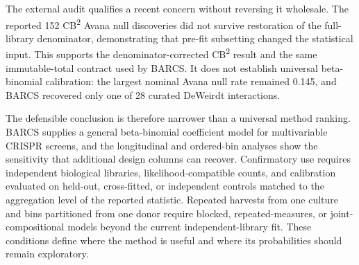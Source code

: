 The external audit qualifies a recent concern without reversing it wholesale.
The reported 152 CB\textsuperscript{2} Avana null discoveries did not survive
restoration of the full-library denominator, demonstrating that pre-fit
subsetting changed the statistical input.  This supports the
denominator-corrected CB\textsuperscript{2} result and the same immutable-total
contract used by BARCS.  It does not establish universal beta-binomial
calibration: the largest nominal Avana null rate remained 0.145, and BARCS
recovered only one of 28 curated DeWeirdt interactions.

The defensible conclusion is therefore narrower than a universal method
ranking.  BARCS supplies a general beta-binomial coefficient model for
multivariable CRISPR screens, and the longitudinal and ordered-bin analyses
show the sensitivity that additional design columns can recover.  Confirmatory
use requires independent biological libraries, likelihood-compatible counts,
and calibration evaluated on held-out, cross-fitted, or independent controls
matched to the aggregation level of the reported statistic.
Repeated harvests from one culture and bins partitioned from one donor require
blocked, repeated-measures, or joint-compositional models beyond the current
independent-library fit.  These conditions define where the method is useful
and where its probabilities should remain exploratory.

